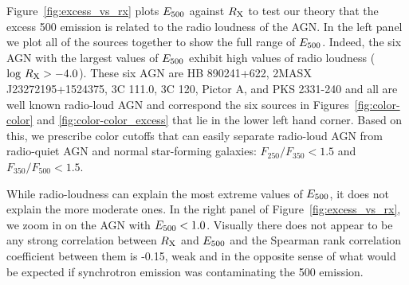 Figure~\ref{fig:excess_vs_rx} plots $E_{\rm 500}$ against $R_{\rm X}$ to test our theory that the excess 500 \um{} emission is related to the radio loudness of the AGN. In the left panel we plot all of the sources together to show the full range of $E_{\rm 500}$. Indeed, the six AGN with the largest values of $E_{\rm 500}$ exhibit high values of radio loudness ($\log\,R_{\rm X} > -4.0$). These six AGN are HB 890241+622, 2MASX J23272195+1524375, 3C 111.0, 3C 120, Pictor A, and PKS 2331-240 and all are well known radio-loud AGN and correspond the six sources in Figures~\ref{fig:color-color} and \ref{fig:color-color_excess} that lie in the lower left hand corner. Based on this, we prescribe color cutoffs that can easily separate radio-loud AGN from radio-quiet AGN and normal star-forming galaxies: $F_{250}/F_{350} < 1.5$ and $F_{350}/F_{500} < 1.5$. 

While radio-loudness can explain the most extreme values of $E_{\rm 500}$, it does not explain the more moderate ones. In the right panel of Figure~\ref{fig:excess_vs_rx}, we zoom in on the AGN with $E_{\rm 500} < 1.0$. Visually there does not appear to be any strong correlation between $R_{\rm X}$ and $E_{\rm 500}$ and the Spearman rank correlation coefficient between them is -0.15, weak and in the opposite sense of what would be expected if synchrotron emission was contaminating the 500 \um{} emission.
  
  